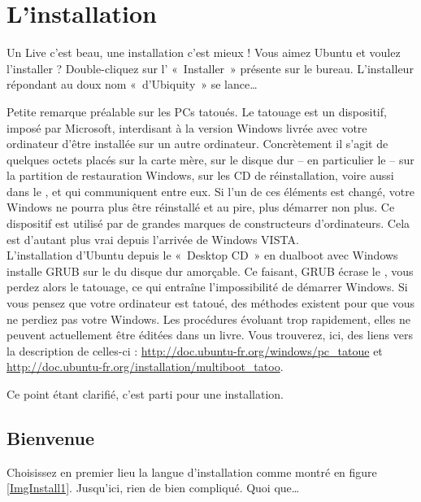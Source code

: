 \section{L'installation}
Un Live c'est beau, une installation c'est mieux ! Vous aimez Ubuntu et voulez l'installer ? Double-cliquez sur l' «~Installer~» présente sur le bureau. L'installeur répondant au doux nom «~d'Ubiquity~» se lance\ldots{}
\begin{attention}
Petite remarque préalable sur les PCs tatoués.\label{RefTatouage}
Le tatouage est un dispositif, imposé par Microsoft, interdisant à la version Windows livrée avec votre ordinateur d'être installée sur un autre ordinateur. Concrètement il s'agit de quelques octets placés sur la carte mère, sur le disque dur -- en particulier le -- sur la partition de restauration Windows, sur les CD de réinstallation, voire aussi dans le , et qui communiquent entre eux. Si l'un de ces éléments est changé, votre Windows ne pourra plus être réinstallé et au pire, plus démarrer non plus. Ce dispositif est utilisé par de grandes marques de constructeurs d'ordinateurs. Cela est d'autant plus vrai depuis l'arrivée de Windows VISTA.\\
L'installation d'Ubuntu depuis le «~Desktop CD~» en dualboot avec Windows installe GRUB sur le  du disque dur amorçable. Ce faisant, GRUB écrase le , vous perdez alors le tatouage, ce qui entraîne l'impossibilité de démarrer Windows. Si vous pensez que votre ordinateur est tatoué, des méthodes existent pour que vous ne perdiez pas votre Windows. Les procédures évoluant trop rapidement, elles ne peuvent actuellement être éditées dans un livre. Vous trouverez, ici, des liens vers la description de celles-ci : \url{http://doc.ubuntu-fr.org/windows/pc_tatoue} et \url{http://doc.ubuntu-fr.org/installation/multiboot_tatoo}.
\end{attention}\par
Ce point étant clarifié, c'est parti pour une installation.
\subsection{Bienvenue}
Choisissez en premier lieu la langue d'installation comme montré en figure \ref{ImgInstall1}. Jusqu'ici, rien de bien compliqué. Quoi que\ldots{}
